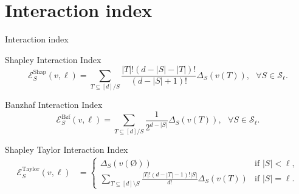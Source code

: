 \documentclass[10pt]{beamer}
\newcommand{\f}{v}
\newcommand{\ex}{\Expl}
\def\Expl{\mathcal{E}}
\newcommand{\setlessell}{\mathcal{S}_\ell }
\begin{document}
\section[Interaction index]{Interaction index}
\begin{frame}{Interaction index}
    \begin{mydefbox}{Shapley Interaction Index}
        \begin{equation*}
            \label{eqn:closed_form_shap_inter}
            \ex_S^{\text{Shap}}(\f, \ell) =  \sum_{T \subseteq [d]/ S}  \frac{|T|! (d-|S|-|T|)!}{(d-|S|+1)!} \Delta_S(\f(T)),\ \ \  
            \forall S \in \setlessell.
            \tag{5}
        \end{equation*}
    \end{mydefbox}
\end{frame}
\begin{frame}
    \begin{mydefbox}{Banzhaf Interaction Index}
        \begin{equation*}
            \label{eqn:closed_form_bzf_inter}
            \ex^{\text{Bzf}}_S(\f,\ell) =  \sum_{T \subseteq [d]/S}  \frac{1}{2^{d-|S|}} \Delta_S(\f(T)),\ \ \  
            \forall  S \in \setlessell.
            \tag{6}
        \end{equation*}
    \end{mydefbox}
\end{frame}
\begin{frame}
    \begin{mydefbox}{Shapley Taylor Interaction Index}
        {\small
        \begin{align*}
            \ex_S^{\text{Taylor}}(\f,\ell) &= 
            \begin{cases}
                \Delta_S(\f(\text{\O})) & \text{if } |S| < \ell, \\
                \sum_{T \subseteq [d] \setminus S} \frac{|T|!(d-|T|-1)!|S|}{d!} \Delta_S(\f(T)) & \text{if } |S| = \ell.
            \end{cases}
            \tag{7}
        \end{align*}
        }
    \end{mydefbox}
\end{frame}
\end{document}

